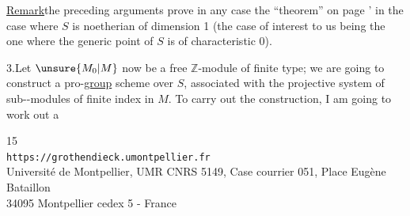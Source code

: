 \uline{Remark}\quad the preceding arguments prove
in any case the  ``theorem'' on page '
in the case where $S$ is noetherian of dimension 1
(the case of interest to us being the one where the generic point of $S$
is of characteristic 0).


3.\quad Let $\unsure{M_0|M}$ now be a free $\mathbb Z$-module
of finite type; we are going to construct a
pro-\uline{group} scheme over $S$, associated
with the projective system of sub--modules
of finite index in $M$. To carry out the
construction, I am going to work out  a

\begin{center}
\small
15\\
\texttt{https://grothendieck.umontpellier.fr}\\
Université de Montpellier, UMR CNRS 5149, Case courrier 051, Place Eugène Bataillon\\
34095 Montpellier cedex 5 - France
\end{center}



